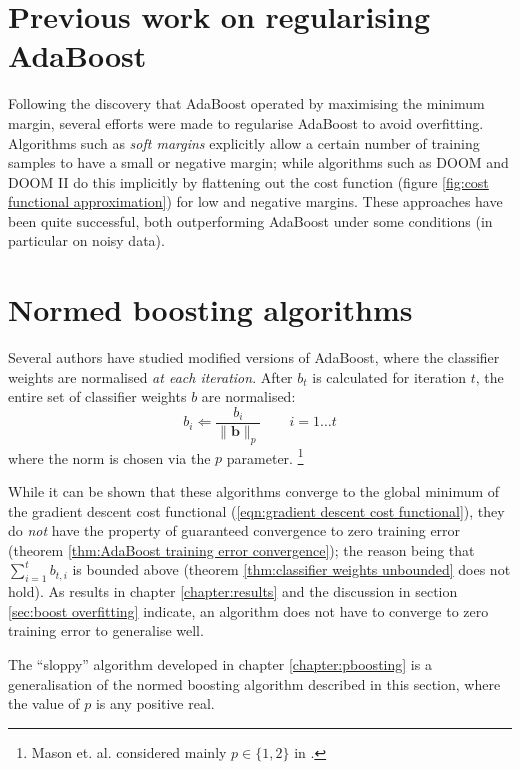 \section{Previous work on regularising AdaBoost}

Following the discovery that AdaBoost operated by maximising the
minimum margin, several efforts were made to regularise AdaBoost to
avoid overfitting.  Algorithms such as \emph{soft margins}
\cite{Ratsch98} explicitly allow a certain number of training samples
to have a small or negative margin; while algorithms such as DOOM and
DOOM II \cite{Mason99a, Mason99b} do this implicitly by flattening out
the cost function (figure \ref{fig:cost functional approximation}) for
low and negative margins.  These approaches have been quite
successful, both outperforming AdaBoost under some conditions (in
particular on noisy data).


\section{Normed boosting algorithms}

Several authors \cite{Mason99a, Breiman97} have studied modified
versions of AdaBoost, where the classifier weights are
normalised \emph{at each iteration}.  After $b_t$ is calculated for
iteration $t$, the entire set of classifier weights $b$ are
normalised:
%
\begin{equation}
b_{i} \Leftarrow \frac{b_i}{\| \mathbf{b} \|_p} \qquad  i=1
\ldots t
\end{equation}
%
where the norm is chosen via the $p$ parameter.%
\footnote{Mason et. al. considered mainly $p \in \{ 1,2 \}$ in
\cite{Mason99a}.}

While it can be shown that these algorithms converge to the global
minimum of the gradient descent cost functional (\ref{eqn:gradient
descent cost functional}), they do \emph{not} have the property of
guaranteed convergence to zero training error (theorem
\ref{thm:AdaBoost training error convergence}); the reason being that 
$\sum_{i=1}^t b_{t,i}$ is bounded above (theorem \ref{thm:classifier
weights unbounded} does not hold).  As results in chapter
\ref{chapter:results} and the discussion in section \ref{sec:boost
overfitting} indicate, an algorithm does not have to converge to zero
training error to generalise well.

The ``sloppy'' algorithm developed in chapter \ref{chapter:pboosting}
is a generalisation of the normed boosting algorithm described in this
section, where the value of $p$ is any positive real.





